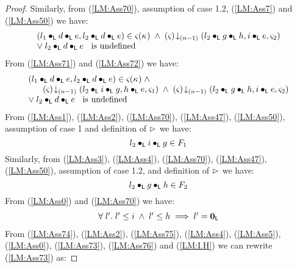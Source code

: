 \begin{lemma}[]
\begin{proof}
Similarly, from (\ref{LM:Ass70}), assumption of case 1.2, (\ref{LM:Ass7}) and (\ref{LM:Ass50}) we have:
%
\begin{align}
	\begin{array}{l}
		(l_1 \bullet_{\textsf{L}} d \bullet_{\textsf{L}} e, l_2 \bullet_{\textsf{L}} d \bullet_{\textsf{L}} e) \in \varsigma_{}(\kappa_{}) \;\land\;
		\left(\varsigma_{}\right) \!\downarrow_{(n-1)} \left(l_2 \bullet_{\textsf{L}} g \bullet_{\textsf{L}} h, i \bullet_{\textsf{L}} e, \varsigma_{2}\right)\\
		\lor\; l_2 \bullet_{\textsf{L}} d \bullet_{\textsf{L}} e \hspace*{0.2cm}\text{ is undefined}
	\end{array} \label{LM:Ass72}
\end{align}
From (\ref{LM:Ass71}) and (\ref{LM:Ass72}) we have:
%
\begin{align}
	\begin{array}{l}
		(l_1 \bullet_{\textsf{L}} d \bullet_{\textsf{L}} e, l_2 \bullet_{\textsf{L}} d \bullet_{\textsf{L}} e) \in \varsigma_{}(\kappa_{}) \;\land\;\\
		\hspace*{0.6cm}\left(\varsigma_{}\right) \!\downarrow_{(n-1)} \left(l_2 \bullet_{\textsf{L}} i \bullet_{\textsf{L}} g, h \bullet_{\textsf{L}} e, \varsigma_{1}\right) \;\land\;
		\left(\varsigma_{}\right) \!\downarrow_{(n-1)} \left(l_2 \bullet_{\textsf{L}} g \bullet_{\textsf{L}} h, i \bullet_{\textsf{L}} e, \varsigma_{2}\right)\\
		\lor\; l_2 \bullet_{\textsf{L}} d \bullet_{\textsf{L}} e \hspace*{0.2cm}\text{ is undefined}
	\end{array} \label{LM:Ass73}
\end{align}
%
From (\ref{LM:Ass1}), (\ref{LM:Ass2}), (\ref{LM:Ass70}), (\ref{LM:Ass47}), (\ref{LM:Ass50}), assumption of case 1 and definition of $\rhd$ we have:
%
\begin{equation}
	l_2 \bullet_{\textsf{L}} i \bullet_{\textsf{L}} g \in F_1 \label{LM:Ass74}
\end{equation}
%
Similarly, from (\ref{LM:Ass3}), (\ref{LM:Ass4}), (\ref{LM:Ass70}), (\ref{LM:Ass47}), (\ref{LM:Ass50}), assumption of case 1.2, and definition of $\rhd$ we have:
%
\begin{equation}
	l_2 \bullet_{\textsf{L}} g \bullet_{\textsf{L}} h \in F_2 \label{LM:Ass75}
\end{equation}
From (\ref{LM:Ass0}) and (\ref{LM:Ass70}) we have:
\begin{align}
\begin{array}{l}
	\forall\; l'.\; l' \leq i \;\land\; l' \leq h \implies l' = \mathbf{0}_{\textsf{L}}
\end{array} \label{LM:Ass76}
\end{align}
From (\ref{LM:Ass74}), (\ref{LM:Ass2}), (\ref{LM:Ass75}), (\ref{LM:Ass4}), (\ref{LM:Ass5}), (\ref{LM:Ass0}),   (\ref{LM:Ass73}), (\ref{LM:Ass76}) and (\ref{LM:I.H}) we can rewrite (\ref{LM:Ass73}) as:

\end{proof}
\end{lemma}
